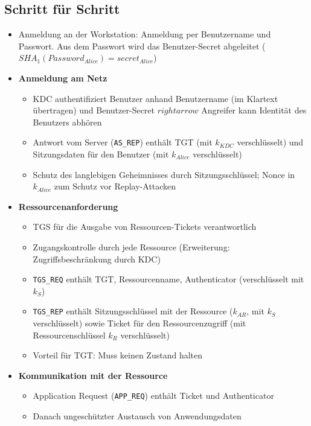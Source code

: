 \subsection{Schritt für Schritt}
\begin{itemize}
	\item Anmeldung an der Workstation: Anmeldung per Benutzername und Passwort. Aus dem Passwort wird das Benutzer-Secret abgeleitet (\(SHA_1(Password_{Alice}) = secret_{Alice}\))
	\item \textbf{Anmeldung am Netz}
	\begin{itemize}
		\item KDC authentifiziert Benutzer anhand Benutzername (im Klartext übertragen) und Benutzer-Secret \(rightarrow\) Angreifer kann Identität des Benutzers abhören
		\item Antwort vom Server (\texttt{AS\_REP}) enthält TGT (mit \(k_{KDC}\) verschlüsselt) und Sitzungsdaten für den Benutzer (mit \(k_{Alice}\) verschlüsselt)
		\item Schutz des langlebigen Geheimnisses durch Sitzungsschlüssel; Nonce in \(k_{Alice}\) zum Schutz vor Replay-Attacken
	\end{itemize}
	\item \textbf{Ressourcenanforderung}
	\begin{itemize}
		\item TGS für die Ausgabe von Ressourcen-Tickets verantwortlich
		\item Zugangskontrolle durch jede Ressource (Erweiterung: Zugriffsbeschränkung durch KDC)
		\item \texttt{TGS\_REQ} enthält TGT, Ressourcenname, Authenticator (verschlüsselt mit \(k_S\))
		\item \texttt{TGS\_REP} enthält Sitzungsschlüssel mit der Ressource (\(k_{AR}\), mit \(k_S\) verschlüsselt) sowie Ticket für den Ressourcenzugriff (mit Ressourcenschlüssel \(k_R\) verschlüsselt)
		\item Vorteil für TGT: Muss keinen Zustand halten
	\end{itemize}
	\item \textbf{Kommunikation mit der Ressource}
	\begin{itemize}
		\item Application Request (\texttt{APP\_REQ}) enthält Ticket und Authenticator
		\item Danach ungeschützter Austausch von Anwendungsdaten
	\end{itemize}
\end{itemize}


